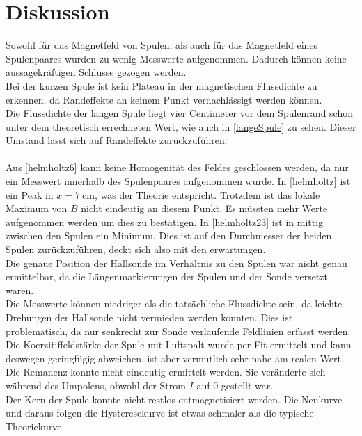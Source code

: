\section{Diskussion}
\label{sec:Diskussion}

Sowohl für das Magnetfeld von Spulen, als auch für das Magnetfeld eines Spulenpaares wurden zu wenig Messwerte aufgenommen.
Dadurch können keine aussagekräftigen Schlüsse gezogen werden.\\
Bei der kurzen Spule ist kein Plateau in der magnetischen Flussdichte zu erkennen, da Randeffekte an keinem
Punkt vernachlässigt werden können. \\
Die Flussdichte der langen Spule liegt vier Centimeter vor dem Spulenrand schon unter dem theoretisch errechneten Wert, wie auch in
\autoref{langeSpule} zu sehen. Dieser Umstand lässt sich auf Randeffekte zurückzuführen.\\
\\
Aus \autoref{helmholtz6} kann keine Homogenität des Feldes geschlossen werden, da nur ein Messwert innerhalb des
Spulenpaares aufgenommen wurde. In \autoref{helmholtz} ist ein Peak in $x = \SI{7}{\centi\meter}$, was der Theorie entspricht.
Trotzdem ist das lokale Maximum von $B$ nicht eindeutig an diesem Punkt. Es müssten mehr Werte aufgenommen werden um dies zu bestätigen.
In \autoref{helmholtz23} ist in mittig zwischen den Spulen ein Minimum. Dies ist auf den Durchmesser der beiden Spulen 
zurückzuführen, deckt sich also mit den erwartungen.\\
Die genaue Position der Hallsonde im Verhältnis zu den Spulen war nicht genau ermittelbar, da die Längenmarkierungen der Spulen und der Sonde
versetzt waren.\\
Die Messwerte können niedriger als die tatsächliche Flussdichte sein, da leichte Drehungen der Hallsonde nicht vermieden werden konnten.
Dies ist problematisch, da nur senkrecht zur Sonde verlaufende Feldlinien erfasst werden.
\\
Die Koerzitiffeldstärke der Spule mit Luftspalt wurde per Fit ermittelt und kann deswegen geringfügig abweichen, ist aber 
vermutlich sehr nahe am realen Wert.\\
Die Remanenz konnte nicht eindeutig ermittelt werden. Sie veränderte sich während des Umpolens, obwohl der Strom $I$ auf 0 gestellt war.\\
Der Kern der Spule konnte nicht restlos entmagnetisiert werden. Die Neukurve und daraus folgen die Hysteresekurve ist etwas schmaler als die typische Theoriekurve.\\



\newpage